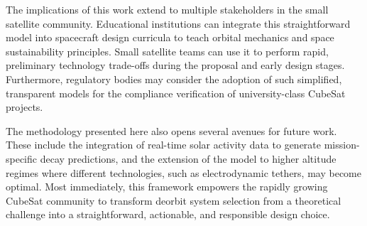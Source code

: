 \documentclass[11pt,a4paper]{article}
\begin{document}
The implications of this work extend to multiple stakeholders in the small satellite community. Educational institutions can integrate this straightforward model into spacecraft design curricula to teach orbital mechanics and space sustainability principles. Small satellite teams can use it to perform rapid, preliminary technology trade-offs during the proposal and early design stages. Furthermore, regulatory bodies may consider the adoption of such simplified, transparent models for the compliance verification of university-class CubeSat projects.

The methodology presented here also opens several avenues for future work. These include the integration of real-time solar activity data to generate mission-specific decay predictions, and the extension of the model to higher altitude regimes where different technologies, such as electrodynamic tethers, may become optimal. Most immediately, this framework empowers the rapidly growing CubeSat community to transform deorbit system selection from a theoretical challenge into a straightforward, actionable, and responsible design choice.
\end{document}
